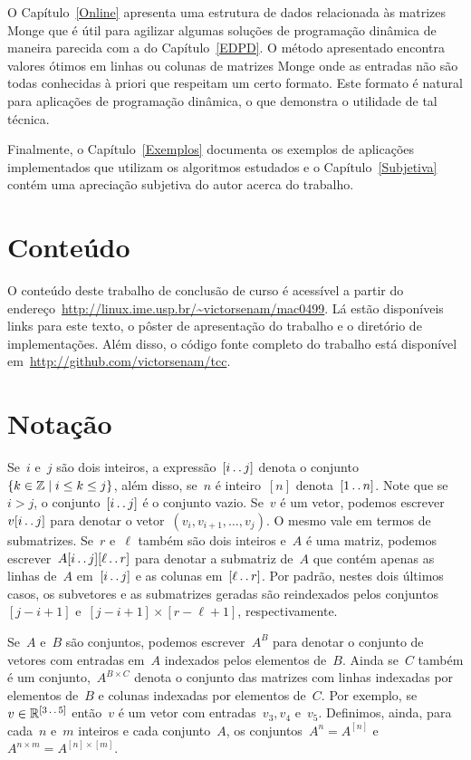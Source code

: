 O Capítulo~\ref{Online} apresenta uma estrutura de dados relacionada às matrizes Monge que é útil para agilizar algumas soluções de programação dinâmica de maneira parecida com a do Capítulo~\ref{EDPD}. O método apresentado encontra valores ótimos em linhas ou colunas de matrizes Monge onde as entradas não são todas conhecidas à priori que respeitam um certo formato. Este formato é natural para aplicações de programação dinâmica, o que demonstra o utilidade de tal técnica.

Finalmente, o Capítulo~\ref{Exemplos} documenta os exemplos de aplicações implementados que utilizam os algoritmos estudados e o Capítulo~\ref{Subjetiva} contém uma apreciação subjetiva do autor acerca do trabalho.

\section{Conteúdo}
O conteúdo deste trabalho de conclusão de curso é acessível a partir do endereço~\href{http://linux.ime.usp.br/~victorsenam/mac0499}{http://linux.ime.usp.br/\textasciitilde{}victorsenam/mac0499}. Lá estão disponíveis links para este texto, o pôster de apresentação do trabalho e o diretório de implementações. Além disso, o código fonte completo do trabalho está disponível em~\href{http://github.com/victorsenam/tcc}{http://github.com/victorsenam/tcc}.

\section{Notação}
Se~$i$ e~$j$ são dois inteiros, a expressão~$[i \,.\,.\, j]$ denota o conjunto~${ \{ k \in \mathbb{Z} \mid i \leq k \leq j \} }$, além disso, se~$n$ é inteiro~$[n]$ denota~$[1 \,.\,.\, n]$. Note que se~$i > j$, o conjunto~$[i \,.\,.\, j]$ é o conjunto vazio. Se~$v$ é um vetor, podemos escrever~$v[i \,.\,.\, j]$ para denotar o vetor~${ (v_i, v_{i+1}, \dots, v_j) }$. O mesmo vale em termos de submatrizes. Se~$r$ e~$\ell$ também são dois inteiros e~$A$ é uma matriz, podemos escrever~$A[i \,.\,.\, j][\ell \,.\,.\, r]$ para denotar a submatriz de~$A$ que contém apenas as linhas de~$A$ em~$[i \,.\,.\, j]$ e as colunas em~$[\ell \,.\,.\, r]$. Por padrão, nestes dois últimos casos, os subvetores e as submatrizes geradas são reindexados pelos conjuntos~$[j - i + 1]$ e~${ [j - i + 1] \times [r - \ell + 1] }$, respectivamente.

Se~$A$ e~$B$ são conjuntos, podemos escrever~$A^B$ para denotar o conjunto de vetores com entradas em~$A$ indexados pelos elementos de~$B$. Ainda se~$C$ também é um conjunto,~$A^{B \times C}$ denota o conjunto das matrizes com linhas indexadas por elementos de~$B$ e colunas indexadas por elementos de~$C$. Por exemplo, se~$v \in \mathbb{R}^{ [3 \,.\,.\, 5] }$ então~$v$ é um vetor com entradas~${ v_3, v_4 }$ e~$v_5$. Definimos, ainda, para cada~$n$ e~$m$ inteiros e cada conjunto~$A$, os conjuntos~${ A^n = A^{ [n] } }$ e~${ A^{n \times m} = A^{[n] \times [m]} }$.

